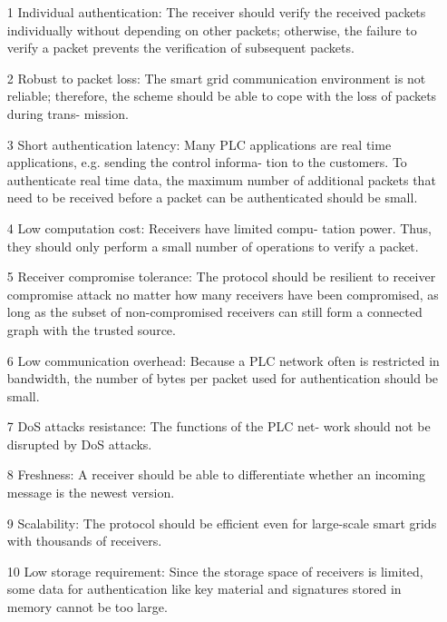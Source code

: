 \documentclass{sig-alternate-05-2015}
\begin{document}
\begin{itemize}
\item[1] Individual authentication: The receiver should verify the received packets individually without depending on other packets; otherwise, the failure to verify a packet prevents the verification of subsequent packets.

\item[2] Robust to packet loss: The smart grid communication environment is not reliable; therefore, the scheme should be able to cope with the loss of packets during trans- mission.

\item[3] Short authentication latency: Many PLC applications are real time applications, e.g. sending the control informa- tion to the customers. To authenticate real time data, the maximum number of additional packets that need to be received before a packet can be authenticated should be small.

\item[4] Low computation cost: Receivers have limited compu- tation power. Thus, they should only perform a small number of operations to verify a packet.

\item[5] Receiver compromise tolerance: The protocol should be resilient to receiver compromise attack no matter how many receivers have been compromised, as long as the subset of non-compromised receivers can still form a connected graph with the trusted source.

\item[6] Low communication overhead: Because a PLC network often is restricted in bandwidth, the number of bytes per packet used for authentication should be small.

\item[7] DoS attacks resistance: The functions of the PLC net- work should not be disrupted by DoS attacks.

\item[8] Freshness: A receiver should be able to differentiate whether an incoming message is the newest version.

\item[9] Scalability: The protocol should be efficient even for large-scale smart grids with thousands of receivers.

\item[10] Low storage requirement: Since the storage space of receivers is limited, some data for authentication like key material and signatures stored in memory cannot be too large.
\end{itemize}
\end{document}
